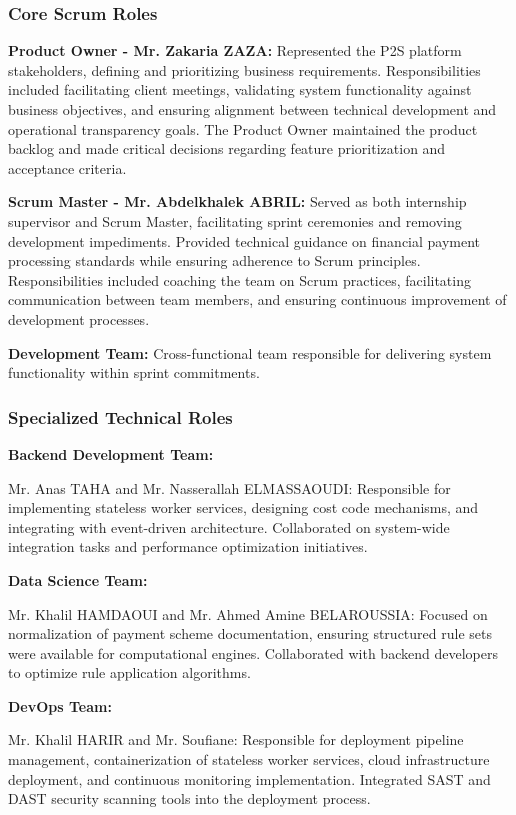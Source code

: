 \subsubsection{Core Scrum Roles}

\textbf{Product Owner - Mr. Zakaria ZAZA:} Represented the P2S platform stakeholders, defining and prioritizing business requirements. Responsibilities included facilitating client meetings, validating system functionality against business objectives, and ensuring alignment between technical development and operational transparency goals. The Product Owner maintained the product backlog and made critical decisions regarding feature prioritization and acceptance criteria.

\textbf{Scrum Master - Mr. Abdelkhalek ABRIL:} Served as both internship supervisor and Scrum Master, facilitating sprint ceremonies and removing development impediments. Provided technical guidance on financial payment processing standards while ensuring adherence to Scrum principles. Responsibilities included coaching the team on Scrum practices, facilitating communication between team members, and ensuring continuous improvement of development processes.

\textbf{Development Team:} Cross-functional team responsible for delivering system functionality within sprint commitments.

\subsubsection{Specialized Technical Roles}

\textbf{Backend Development Team:}

Mr. Anas TAHA and Mr. Nasserallah ELMASSAOUDI: Responsible for implementing stateless worker services, designing cost code mechanisms, and integrating with event-driven architecture. Collaborated on system-wide integration tasks and performance optimization initiatives.

\textbf{Data Science Team:}

Mr. Khalil HAMDAOUI and Mr. Ahmed Amine BELAROUSSIA: Focused on normalization of payment scheme documentation, ensuring structured rule sets were available for computational engines. Collaborated with backend developers to optimize rule application algorithms.

\textbf{DevOps Team:}

Mr. Khalil HARIR and Mr. Soufiane: Responsible for deployment pipeline management, containerization of stateless worker services, cloud infrastructure deployment, and continuous monitoring implementation. Integrated SAST and DAST security scanning tools into the deployment process.

